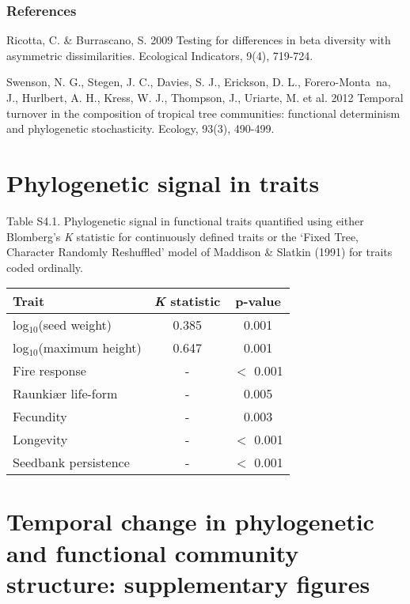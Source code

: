 \subsubsection*{References}

Ricotta, C. \& Burrascano, S. 2009 Testing for differences in beta diversity
with asymmetric dissimilarities. Ecological Indicators, 9(4), 719-724.

Swenson, N. G., Stegen, J. C., Davies, S. J., Erickson, D. L., Forero-Monta~na,
J., Hurlbert, A. H., Kress, W. J., Thompson, J., Uriarte, M. et al. 2012
Temporal turnover in the composition of tropical tree communities: functional
determinism and phylogenetic stochasticity. Ecology, 93(3), 490-499.

\section{Phylogenetic signal in traits}


\footnotesize Table S4.1. Phylogenetic signal in functional traits quantified using either Blomberg's \textit{K} statistic for continuously defined traits or the `Fixed Tree, Character Randomly Reshuffled' model of Maddison \& Slatkin (1991) for traits coded ordinally.
\begin{table}[H]
\centering
\begin{tabular}{lcc}
\hline Trait & \textit{K} statistic & p-value\\
\hline log$_{10}$(seed weight)
 & 0.385 & 0.001 \\ 
log$_{10}$(maximum height)
 & 0.647 & 0.001 \\ 
Fire response & - & $<$ 0.001 \\ 
Raunki\ae r life-form
 & - & 0.005 \\ 
Fecundity & - & 0.003 \\ 
Longevity
 & - & $<$ 0.001 \\ 
Seedbank persistence
 & - & $<$ 0.001 \\ 
\hline 
\end{tabular} 
\end{table}

\pagebreak

\section{Temporal change in phylogenetic and functional community structure: supplementary figures}


